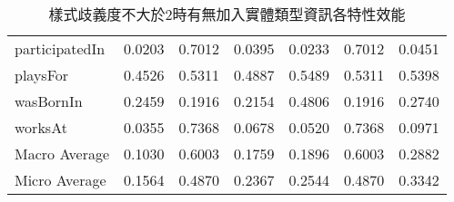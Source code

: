 \begin{table}[htbp]
\begin{tabular}{|l||c|c|c||c|c|c|}
 participatedIn & 0.0203 & 0.7012 & 0.0395 & 0.0233 & 0.7012 & 0.0451 \\
 playsFor & 0.4526 & 0.5311 & 0.4887 & 0.5489 & 0.5311 & 0.5398 \\
 wasBornIn & 0.2459 & 0.1916 & 0.2154 & 0.4806 & 0.1916 & 0.2740 \\
 worksAt & 0.0355 & 0.7368 & 0.0678 & 0.0520 & 0.7368 & 0.0971 \\
    \hline
 Macro Average & 0.1030 & 0.6003 & 0.1759 & 0.1896 & 0.6003 & 0.2882 \\
 Micro Average & 0.1564 & 0.4870 & 0.2367 & 0.2544 & 0.4870 & 0.3342 \\
    \hline
 \end{tabular}
\caption{樣式歧義度不大於2時有無加入實體類型資訊各特性效能}
 \label{t:type}
 \end{table}

